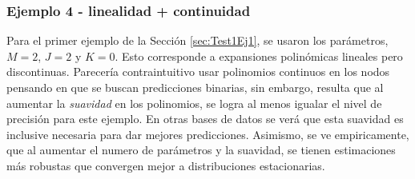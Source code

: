 \documentclass[../Main/Main.tex]{subfiles}
\begin{document}
\subsubsection*{Ejemplo 4 - linealidad + continuidad}
Para el primer ejemplo de la Sección \ref{sec:Test1Ej1}, se usaron los parámetros, $M = 2$, $J = 2$ y $K = 0$. Esto corresponde a expansiones polinómicas lineales pero discontinuas. Parecería contraintuitivo usar polinomios continuos en los nodos pensando en que se buscan predicciones binarias, sin embargo, resulta que al aumentar la \textit{suavidad} en los polinomios, se logra al menos igualar el nivel de precisión para este ejemplo. En otras bases de datos se verá que esta suavidad es inclusive necesaria para dar mejores predicciones. Asimismo, se ve empiricamente, que al aumentar el numero de parámetros y la suavidad, se tienen estimaciones más robustas que convergen mejor a distribuciones estacionarias.
\end{document}
